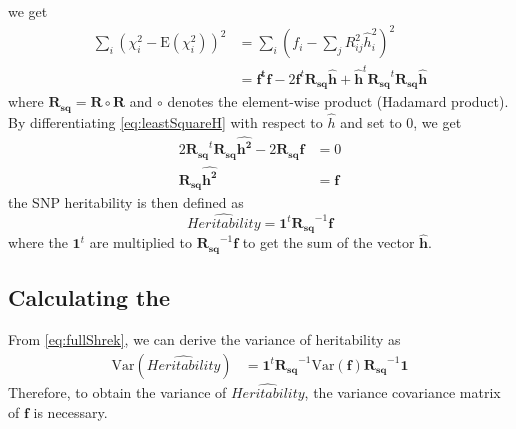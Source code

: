 			we get
			\begin{align}
			\sum_i(\chi_i^2-\mathrm{E}(\chi_i^2))^2&=\sum_i(f_i-\sum_j{R^2_{ij}\hat{h}_i^2})^2 \nonumber\\
			&=\boldsymbol{f^tf}-2\boldsymbol{f}^t\boldsymbol{R_{sq}\hat{h}}+\boldsymbol{\hat{h}}^t\boldsymbol{R_{sq}}^t\boldsymbol{R_{sq}\hat{h}}
			\label{eq:leastSquareH}
			\end{align}
			where $\boldsymbol{R_{sq}} = \boldsymbol{R}\circ\boldsymbol{R}$ and $\circ$ denotes the element-wise product (Hadamard product).
			By differentiating \cref{eq:leastSquareH} with respect to $\hat{h}$ and set to 0, we get
			\begin{align}
				2\boldsymbol{R_{sq}}^t\boldsymbol{R_{sq}}\boldsymbol{\hat{h^2}}-2\boldsymbol{R_{sq}f}&=0 \nonumber\\
				\boldsymbol{R_{sq}}\boldsymbol{\hat{h^2}} &=\boldsymbol{f}
				\label{eq:shrekEq}
			\end{align}
			the \gls{SNP} heritability is then defined as 
			\begin{equation}
			\hat{Heritability} = \boldsymbol{1}^t\boldsymbol{R_{sq}}^{-1}\boldsymbol{f}
			\label{eq:fullShrek}
			\end{equation}
			where the $\boldsymbol{1}^t$ are multiplied to $\boldsymbol{R_{sq}}^{-1}\boldsymbol{f}$ to get the sum of the vector $\hat{\boldsymbol{h}}$.
			
		\subsection{Calculating the }
			From \cref{eq:fullShrek}, we can derive the variance of heritability as 
			\begin{align}
				\mathrm{Var}(\hat{Heritability})
				&=\boldsymbol{1}^t\boldsymbol{R_{sq}}^{-1}\mathrm{Var}(\boldsymbol{f})\boldsymbol{R_{sq}}^{-1}\boldsymbol{1}
				\label{eq:varHvarf}
			\end{align}
			Therefore, to obtain the variance of $\hat{Heritability}$, the variance covariance matrix of $\boldsymbol{f}$ is necessary.
			
